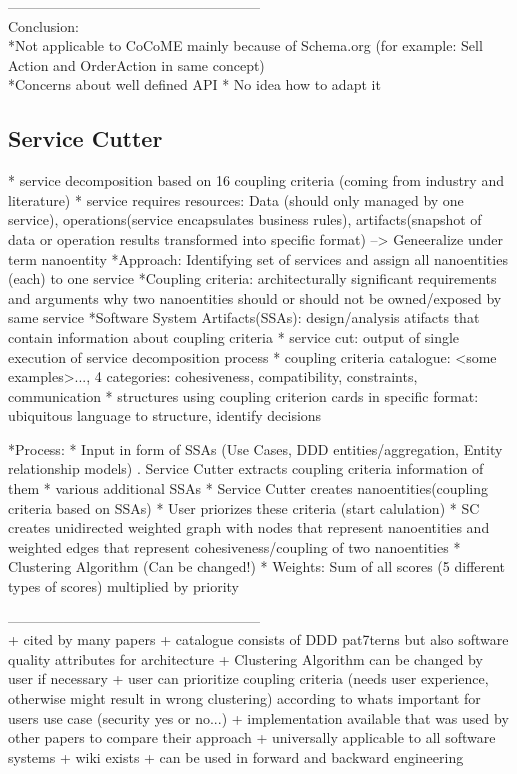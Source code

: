 ------------------------------------------------------\\

Conclusion:\\
*Not applicable to CoCoME mainly because of Schema.org (for example: Sell Action and OrderAction in same concept) \\
*Concerns about  well defined API
* No idea how to adapt it

\subsection{Service Cutter}

* service decomposition based on 16 coupling criteria (coming from industry and literature)
* service requires resources: Data (should only managed by one service), operations(service encapsulates business rules), artifacts(snapshot of data or operation results transformed into specific format) --> Geneeralize under term nanoentity
*Approach: Identifying set of services and assign all nanoentities (each) to one service
*Coupling criteria: architecturally significant requirements and arguments why two nanoentities should or should not be owned/exposed by same service
*Software System Artifacts(SSAs): design/analysis atifacts that contain information about coupling criteria
* service cut: output of single execution of service decomposition process
* coupling criteria catalogue:  <some examples>..., 4 categories: cohesiveness, compatibility, constraints, communication
* structures using coupling criterion cards in specific format: ubiquitous language to structure, identify decisions

*Process:
* Input in form of SSAs (Use Cases, DDD entities/aggregation, Entity relationship models) . Service Cutter extracts coupling criteria information of them
* various additional SSAs
* Service Cutter creates nanoentities(coupling criteria based on SSAs)
* User priorizes these criteria (start calulation)
* SC creates unidirected weighted graph with nodes that represent nanoentities and weighted edges that represent cohesiveness/coupling of two nanoentities
* Clustering Algorithm (Can be changed!)
* Weights: Sum of all scores (5 different types of scores) multiplied by priority

------------------------------------------------------\\

+ cited by many papers 
+ catalogue consists of DDD pat7terns but also software quality attributes for architecture
+ Clustering Algorithm can be changed by user if necessary
+ user can prioritize coupling criteria (needs user experience, otherwise might result in wrong clustering) according to whats important for users use case (security yes or no...)
+ implementation available that was used by other papers to compare their approach
+ universally applicable to all software systems
+ wiki exists
+ can be used in forward  and backward engineering

